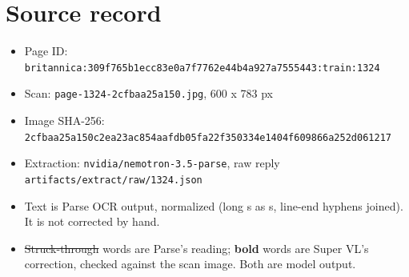 \documentclass[10pt]{article}
\begin{document}
\section*{Source record}
\begin{itemize}
\item Page ID: \texttt{britannica:309f765b1ecc83e0a7f7762e44b4a927a7555443:train:1324}
\item Scan: \texttt{page-1324-2cfbaa25a150.jpg}, 600 x 783 px
\item Image SHA-256: \texttt{\small 2cfbaa25a150c2ea23ac854aafdb05fa22f350334e1404f609866a252d061217}
\item Extraction: \texttt{nvidia/nemotron-3.5-parse}, raw reply \texttt{artifacts/extract/raw/1324.json}
\item Text is Parse OCR output, normalized (long s as s, line-end hyphens joined). It is not corrected by hand.
\item \sout{Struck-through} words are Parse's reading; \textbf{bold} words are Super VL's correction, checked against the scan image. Both are model output.
\end{itemize}
\end{document}
